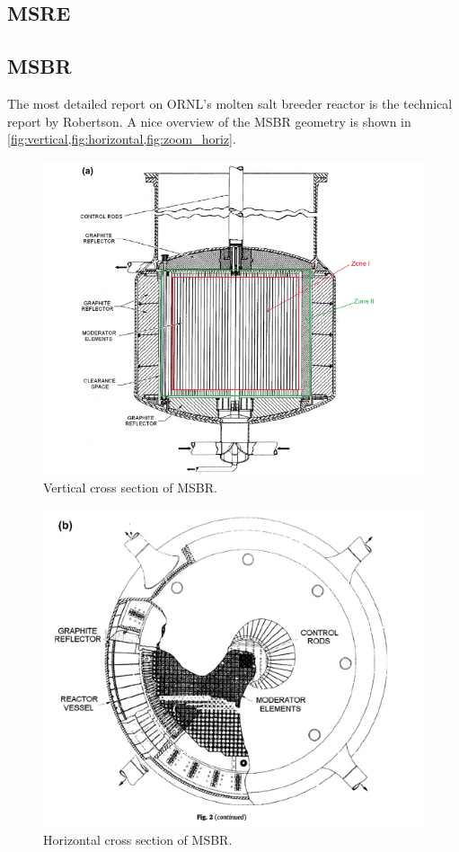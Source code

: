 \documentclass{article}
\begin{document}
\subsection{MSRE}

\subsection{MSBR}

The most detailed report on ORNL's molten salt breeder reactor is the technical
report by Robertson. \cite{robertson_conceptual_1971} A nice overview of the
MSBR geometry is shown in \cref{fig:vertical,fig:horizontal,fig:zoom_horiz}.

\begin{figure}[htpb]
  \centering
  \includegraphics{vertical_MSBR_cross_section.png}
  \caption{Vertical cross section of MSBR.}
  \label{fig:vertical}
\end{figure}
\begin{figure}[htpb]
  \centering
  \includegraphics{horizontal_MSBR_cross_section.png}
  \caption{Horizontal cross section of MSBR.}
  \label{fig:horizontal}
\end{figure}
\end{document}
